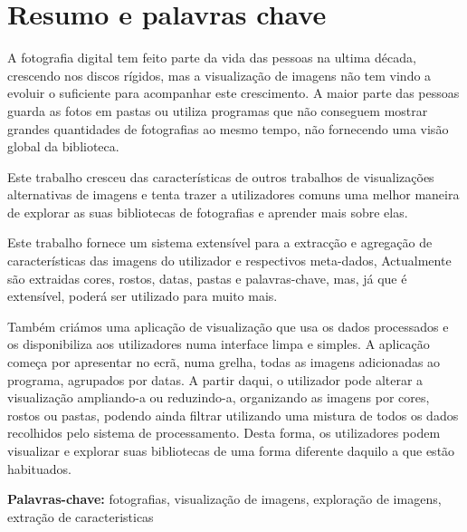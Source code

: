 
\chapter*{Resumo e palavras chave}


A fotografia digital tem feito parte da vida das pessoas na ultima década, crescendo nos discos rígidos, mas a visualização de imagens não tem vindo a evoluir o suficiente para acompanhar este crescimento. A maior parte das pessoas guarda as fotos em pastas ou utiliza programas que não conseguem mostrar grandes quantidades de fotografias ao mesmo tempo, não fornecendo uma visão global da biblioteca.

Este trabalho cresceu das características de outros trabalhos de visualizações alternativas de imagens e tenta trazer a utilizadores comuns uma melhor maneira de explorar as suas bibliotecas de fotografias e aprender mais sobre elas.

Este trabalho fornece um sistema extensível para a extracção e agregação de características das imagens do utilizador e respectivos meta-dados, Actualmente são extraidas cores, rostos, datas, pastas e palavras-chave, mas, já que é extensível, poderá ser utilizado para muito mais.

Também criámos uma aplicação de visualização que usa os dados processados e os disponibiliza aos utilizadores numa interface limpa e simples. A aplicação começa por apresentar no ecrã, numa grelha, todas as imagens adicionadas ao programa, agrupados por datas. A partir daqui, o utilizador pode alterar a visualização ampliando-a ou reduzindo-a, organizando as imagens por cores, rostos ou pastas, podendo ainda filtrar utilizando uma mistura de todos os dados recolhidos pelo sistema de processamento. Desta forma, os utilizadores podem visualizar e explorar suas bibliotecas de uma forma diferente daquilo a que estão habituados.

\vfill

\textbf{Palavras-chave:} fotografias, visualização de imagens, exploração de imagens, extração de caracteristicas

\cleardoublepage

